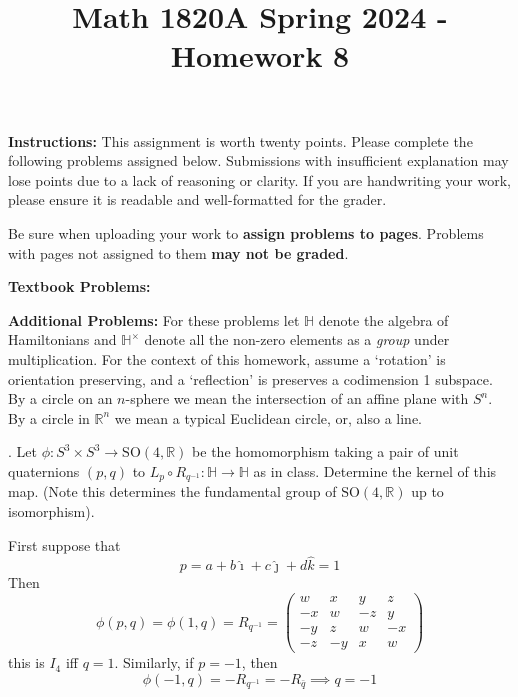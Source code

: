 \documentclass[12pt]{article}
\title{Math 1820A Spring 2024 - Homework 8}
\date{}
\newcommand{\R}{\mathbb{R}}
\newcommand{\SO}{\text{SO}}
\newcommand{\lra}{\longrightarrow}
\renewcommand{\H}{\mathbb{H}}
\newcommand{\ihat}{\hat{\imath}}
\newcommand{\jhat}{\hat{\jmath}}
\newcommand{\khat}{\hat{k}}
\begin{document}
\maketitle
\vspace{-0.5in}
\begin{spacing}{1.5}
\noindent \textbf{Instructions:}  This assignment is worth twenty points.  Please complete the following problems assigned below.  Submissions with insufficient explanation may lose points due to a lack of reasoning or clarity.  If you are handwriting your work, please ensure it is readable and well-formatted for the grader.

Be sure when uploading your work to \textbf{assign problems to pages}.  Problems with pages not assigned to them \textbf{may not be graded}.  
\end{spacing}




\vspace{10mm}\noindent
\textbf{Textbook Problems: }  

\noindent
\textbf{Additional Problems:}   For these problems let $\H$ denote the algebra of Hamiltonians and $\H^{\times}$ denote all the non-zero elements as a \emph{group} under multiplication.  For the context of this homework, assume a `rotation' is orientation preserving, and a `reflection' is preserves a codimension 1 subspace.  By a circle on an $n$-sphere we mean the intersection of an affine plane with $S^{n}$.  By a circle in $\R^{n}$ we mean a typical Euclidean circle, or, also a line. 

.  Let $\phi: S^{3} \times S^{3} \lra \SO(4,\R)$ be the homomorphism taking a pair of unit quaternions $(p,q)$ to $L_{p}\circ R_{q^{-1}} : \H \lra \H$ as in class.  Determine the kernel of this map.  (Note this determines the fundamental group of $\SO(4,\R)$ up to isomorphism). 

    \color{blue}
        First suppose that 
        \[p = a + b\ihat + c\jhat + d\khat = 1\]
        Then 
        \[\phi(p, q) = \phi(1, q) = R_{q^{-1}} = \begin{pmatrix}
            w & x & y & z \\
            -x & w & -z & y \\
            -y & z & w & -x \\
            -z & -y & x & w
        \end{pmatrix}\] 
        this is $I_4$ iff $q = 1$. Similarly, if $p = -1$, then 
        \[\phi(-1, q) = -R_{q^{-1}} = -R_{\bar q} \implies q = -1\]
\end{document}
